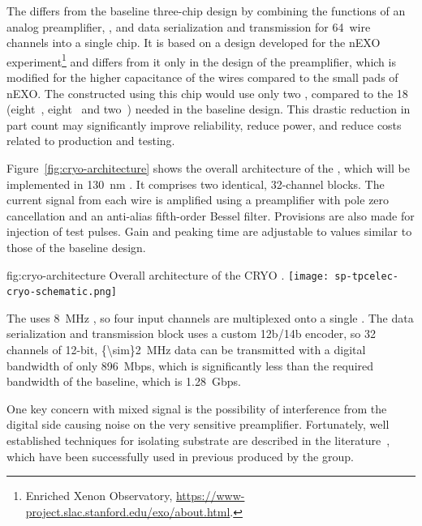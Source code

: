The    differs from the baseline three-chip design by combining the functions of an analog preamplifier, , and data serialization and transmission for \num{64}~wire channels into a single chip.
It is based on a design developed for the nEXO experiment\footnote{Enriched Xenon Observatory, \url{https://www-project.slac.stanford.edu/exo/about.html}.} and differs from it only in the design of the preamplifier, which is modified for the higher capacitance of the   wires compared to the small pads of nEXO.
The  constructed using this chip would use only two , compared to the \num{18} (eight~, eight~ and two~) needed in the baseline design.
This drastic reduction in part count may significantly improve  reliability, reduce power, and reduce costs related to production and testing. 

Figure~\ref{fig:cryo-architecture} shows the overall architecture of the  , which will be implemented in \SI{130}{nm} .
It comprises two identical, \num{32}-channel blocks. 
The current signal from each wire is amplified using a preamplifier with pole zero cancellation and an anti-alias fifth-order Bessel filter. 
Provisions are also made for injection of test pulses. 
Gain and peaking time are adjustable to values similar to those of the baseline design.

\begin{dunefigure}
{fig:cryo-architecture}
{Overall architecture of the CRYO .}
\texttt{[image: sp-tpcelec-cryo-schematic.png]}
\end{dunefigure}

The  uses \SI{8}{MHz} , so four input channels are multiplexed onto a single . The data serialization and transmission block uses a custom 12b/14b encoder, so \num{32} channels of \num{12}-bit, \SI{{\sim}2}{MHz} data can be transmitted with a digital bandwidth of only \SI{896}{Mbps}, which is significantly less than the required bandwidth of the baseline, which is \SI{1.28}{Gbps}.

One key concern with mixed signal  is the possibility of interference from the digital side causing noise on the very sensitive preamplifier. 
Fortunately, well established techniques for isolating substrate are described in the literature~\cite{yeh}, which have been successfully used in previous  produced by the  group.%

